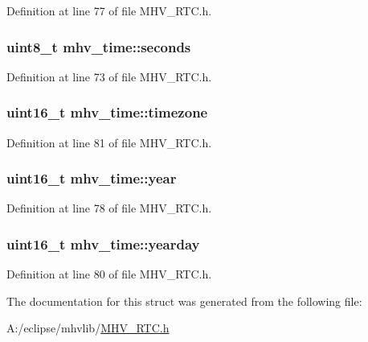 \-Definition at line 77 of file \-M\-H\-V\-\_\-\-R\-T\-C.\-h.

\hypertarget{structmhv__time_a4844293af0a3648391fb9335f2aa758c}{
\subsubsection[{seconds}]{\setlength{\rightskip}{0pt plus 5cm}uint8\-\_\-t {\bf mhv\-\_\-time\-::seconds}}}
\label{structmhv__time_a4844293af0a3648391fb9335f2aa758c}


\-Definition at line 73 of file \-M\-H\-V\-\_\-\-R\-T\-C.\-h.

\hypertarget{structmhv__time_abe9ad1b2bfd43e6688c07367a279c50b}{
\subsubsection[{timezone}]{\setlength{\rightskip}{0pt plus 5cm}uint16\-\_\-t {\bf mhv\-\_\-time\-::timezone}}}
\label{structmhv__time_abe9ad1b2bfd43e6688c07367a279c50b}


\-Definition at line 81 of file \-M\-H\-V\-\_\-\-R\-T\-C.\-h.

\hypertarget{structmhv__time_ab5441551ca64fde709afdc98fa5c851e}{
\subsubsection[{year}]{\setlength{\rightskip}{0pt plus 5cm}uint16\-\_\-t {\bf mhv\-\_\-time\-::year}}}
\label{structmhv__time_ab5441551ca64fde709afdc98fa5c851e}


\-Definition at line 78 of file \-M\-H\-V\-\_\-\-R\-T\-C.\-h.

\hypertarget{structmhv__time_aa5e9d8969550c007c40f6b2dd404d3d6}{
\subsubsection[{yearday}]{\setlength{\rightskip}{0pt plus 5cm}uint16\-\_\-t {\bf mhv\-\_\-time\-::yearday}}}
\label{structmhv__time_aa5e9d8969550c007c40f6b2dd404d3d6}


\-Definition at line 80 of file \-M\-H\-V\-\_\-\-R\-T\-C.\-h.



\-The documentation for this struct was generated from the following file\-:\begin{DoxyCompactItemize}
\item 
\-A\-:/eclipse/mhvlib/\hyperlink{_m_h_v___r_t_c_8h}{\-M\-H\-V\-\_\-\-R\-T\-C.\-h}\end{DoxyCompactItemize}
